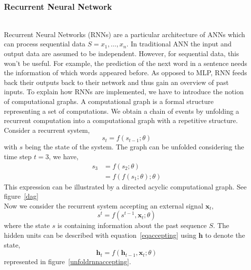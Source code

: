 
\subsubsection{Recurrent Neural Network}~\\


Recurrent Neural Networks (RNNs) are a particular architecture of ANNs which can
process sequential data $S = x_{1},\dots,x_{n}$. In traditional ANN the input
and output data are assumed to be independent. However, for sequential data,
this won't be useful. For example, the prediction of the next word in a sentence
needs the information of which words appeared before. As opposed to MLP, RNN
feeds back their outputs back to their network and thus gain an overview of past
inputs. To explain how RNNs are implemented, we have to introduce the notion of
computational graphs. A computational graph is a formal structure representing a
set of computations. We obtain a chain of events by unfolding a recurrent
computation into a computational graph with a repetitive structure. \\

Consider a recurrent system,
\begin{equation}
  s_{t} = f(s_{t-1};\theta)
\end{equation}
with $s$ being the state of the system. The graph can be unfolded considering
the time step $t = 3$, we have,
\begin{equation}
  \begin{split}
    s_{3} & = f(s_{2};\theta) \\
          & = f(f(s_{1};\theta);\theta)
  \end{split}
  \label{recurrentsystem}
\end{equation}
This expression can be illustrated by a directed acyclic computational graph.
See figure~\ref{dag}\\


Now we consider the recurrent system accepting an external signal $\bm{x}_{t}$,
\begin{equation}
  s^{t} = f(s^{t-1},\bm{x}_{t};\theta)
  \label{eqaccepting}
\end{equation}
where the state $s$ is containing information about the past sequence $S$. The
hidden units can be described with equation~\ref{eqaccepting} using $\bm{h}$ to
denote the state,
\begin{equation}
  \bm{h}_{t} = f(\bm{h}_{t-1},\bm{x}_{t};\theta)
\end{equation}
represented in figure~\ref{unfoldrnnaccepting}.\\


